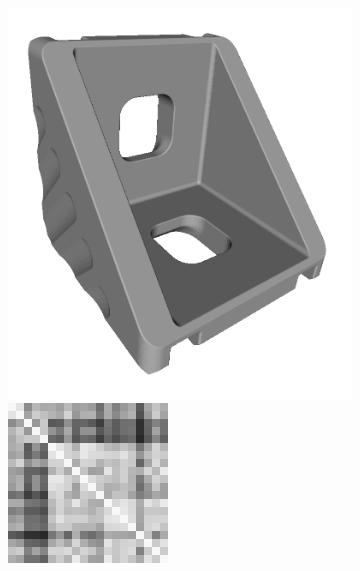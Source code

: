 \begin{figure}[ht]
\begin{subfigure}[b]{0.23\linewidth}
	\end{subfigure}
	\begin{subfigure}[b]{0.23\linewidth}
		\includegraphics[width=\linewidth]{fig/reg/bracket.png} \\
		\includegraphics[width=\linewidth]{fig/reg/reg3Dtrain_bracket.png} 

\end{subfigure}
\end{figure}
